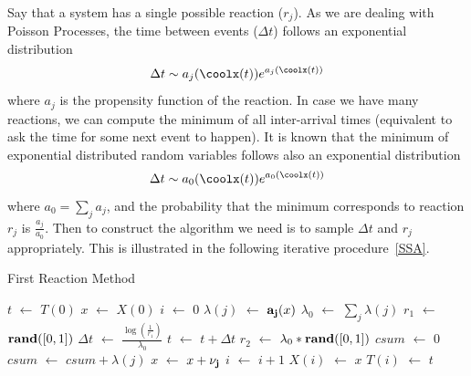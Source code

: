 \documentclass[letterpaper]{article}
\newcommand*\Let[2]{\State #1 $\gets$ #2}
\begin{document}
Say that a system has a single possible reaction ($r_j$). As
we are dealing with Poisson Processes, the time between events
($\Delta t$) follows an exponential distribution
$$\Delta t \sim a_j(\coolx(t)) e^{a_j(\coolx(t))}$$
where $a_j$ is the propensity function of the reaction. In case we
have many reactions, we can compute the minimum of all inter-arrival
times (equivalent to ask the time for some next event to happen). It
is known that the minimum of exponential distributed random variables
follows also an exponential distribution
$$\Delta t \sim a_0(\coolx(t)) e^{a_0(\coolx(t))}$$
where $a_0=\sum_{j}a_j$, and the probability that the minimum
corresponds to reaction $r_j$ is $\frac{a_j}{a_0}$. Then to construct
the algorithm we need is to sample $\Delta t$ and $r_j$
appropriately. This is illustrated in the following iterative
procedure~\ref{SSA}.
\begin{algorithm}
  \caption{First Reaction Method}
  \label{SSA}
  \begin{algorithmic}[1]
    \Let{$t$}{$T(0)$}
    \Let{$x$}{$X(0)$}
    \Let{$i$}{$0$}
     
     
    \Let{$\lambda(j)$}{${\bf a_j}(x)$} 
    \EndFor
    \Let{$\lambda_0$}{$\sum_{j} \lambda(j)$} 
    \Let{$r_1$}{$\textrm{\bf rand}([0,1])$} 
    \Let{$\Delta t$}{$\frac{\log(\frac{1}{r_1})}{\lambda_0}$} 
    \Let{$t$}{$t + \Delta t$} 
    \Let{$r_2$}{$\lambda_0*\textrm{\bf rand}([0,1])$} 
    \Let{$csum$}{0} 
     
    \Let{$csum$}{$csum+\lambda(j)$} 
     
    \Let{$x$}{$x + {\bf \nu_j}$} 
    \EndIf
    \EndFor
    \Let{$i$}{$i+1$} 
    \Let{$X(i)$}{$x$} 
    \Let{$T(i)$}{$t$} 
    \EndWhile
  \end{algorithmic}
\end{algorithm}
\end{document}

